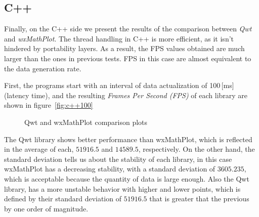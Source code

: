 \subsection{C++}

Finally, on the C++ side we present the  results of the comparison between
\emph{Qwt} and \emph{wxMathPlot}.
The thread handling in C++ is more efficient,
as it isn't hindered by portability layers.
As a result,
the FPS values obtained are much larger than the ones in previous tests.
FPS in this case are almost equivalent to the data generation rate.

First, the programs start with an interval of data actualization of 100\,[ms] (latency time),
and the resulting \emph{Frames Per Second (FPS)} of each library are shown in figure~\ref{fig:c++100}
\begin{figure}%
  \label{fig:figure4}
  \caption{Qwt and wxMathPlot comparison plots}
\end{figure}
The Qwt library shows better performance than wxMathPlot,
which is reflected in the average of each, $51916.5$ and $14589.5$,
respectively.
On the other hand, the standard deviation tells us about the stability
of each library, in this case wxMathPlot has a decreasing stability,
with a standard deviation of $3605.235$, which is acceptable because
the quantity of data is large enough. Also the Qwt library,
has a more unstable behavior with higher and lower points,
which is defined by their standard deviation of $51916.5$ that is
greater that the previous by one order of magnitude.

